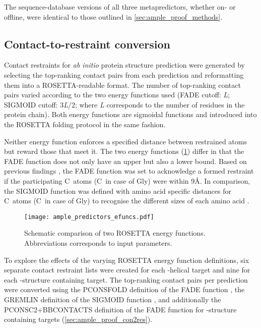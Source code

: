 The sequence-database versions of all three metapredictors, whether on- or offline, were identical to those outlined in \cref{sec:ample_proof_methods}.

\subsection{Contact-to-restraint conversion} \label{subsec:ample_predictors_con2res}
Contact restraints for \textit{ab initio} protein structure prediction were generated by selecting the top-ranking contact pairs from each prediction and reformatting them into a ROSETTA-readable format. The number of top-ranking contact pairs varied according to the two energy functions used (FADE cutoff: \textit{L}; SIGMOID cutoff: 3\textit{L}/2; where \textit{L} corresponds to the number of residues in the protein chain). Both energy functions are sigmoidal functions and introduced into the ROSETTA folding protocol in the same fashion. 

Neither energy function enforces a specified distance between restrained atoms but reward those that meet it. The two energy functions (\cref{fig:ample_predictors_efuncs}) differ in that the FADE function does not only have an upper but also a lower bound. Based on previous findings \cite{Michel2014-eg, Skwark2014-qp}, the FADE function was set to acknowledge a formed restraint if the participating C\textbeta\ atoms (C\textalpha\ in case of Gly) were within 9\AA. In comparison, the SIGMOID function was defined with amino acid specific distances for C\textbeta\ atoms (C\textalpha\ in case of Gly) to recognise the different sizes of each amino acid \cite{Kamisetty2013-le, Ovchinnikov2015-tn}.

\begin{figure}[H]
    \centering
    \texttt{[image: ample\_predictors\_efuncs.pdf]}
    \caption[Schematic comparison of ROSETTA energy functions]{Schematic comparison of two ROSETTA energy functions. Abbreviations corresponds to input parameters.}
    \label{fig:ample_predictors_efuncs}
\end{figure}

To explore the effects of the varying ROSETTA energy function definitions, six separate contact restraint lists were created for each \textalpha-helical target and nine for each \textbeta-structure containing target. The top-ranking contact pairs per prediction were converted using the PCONSFOLD definition of the FADE function \cite{Michel2014-eg}, the GREMLIN definition of the SIGMOID function \cite{Ovchinnikov2015-tn}, and additionally the PCONSC2+BBCONTACTS definition of the FADE function for \textbeta-structure containing targets (\cref{sec:ample_proof_con2res}).

